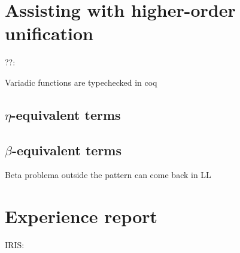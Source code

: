 \cite{tabling-dm,tabling-pie}


\section{Assisting with higher-order unification}

\cite{Fissore2024}

??: \cite{felty93}

Variadic functions are typechecked in coq~\cite{cpdt}

\subsection{\texorpdfstring{$\eta$}{eta}-equivalent terms}


\subsection{\texorpdfstring{$\beta$}{beta}-equivalent terms}
\cite{pientka11}

Beta problema outside the pattern can come back in LL~\cite{teyjus}

\section{Experience report}
IRIS: \cite{iris-junk}




